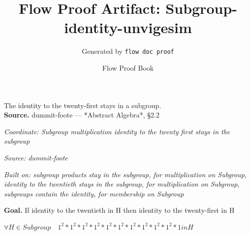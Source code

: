 \documentclass[11pt]{article}
\title{Flow Proof Artifact: Subgroup-identity-unvigesim}
\author{Generated by \texttt{flow doc proof}}
\date{Flow Proof Book}
\theoremstyle{definition}
\begin{document}
\maketitle
The identity to the twenty-first stays in a subgroup.\\[0.5em]
\textbf{Source.} dummit-foote — *Abstract Algebra*, §2.2\\[0.5em]
\bigskip
{}\par
\smallskip\noindent\textit{Coordinate: Subgroup \cdot multiplication \cdot identity to the twenty first stays in the subgroup}\par
\smallskip\noindent\textit{Source: dummit-foote}\par
\smallskip\noindent\textit{Built on: subgroup products stay in the subgroup, for multiplication on Subgroup, identity to the twentieth stays in the subgroup, for multiplication on Subgroup, subgroups contain the identity, for membership on Subgroup}\par
\medskip
\noindent\textbf{Goal.} If identity to the twentieth in H then identity to the twenty-first in H\par
\noindent$\displaystyle \forall H \in Subgroup\quad 1^{2} * 1^{2} * 1^{2} * 1^{2} * 1^{2} * 1^{2} * 1^{2} * 1^{2} * 1^{2} * 1^{2} * 1 in H$\par
\medskip
\noindent
\end{document}
